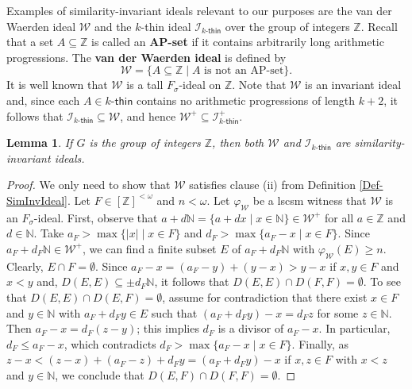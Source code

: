 \documentclass{amsart}
\newtheorem{lemma}[theorem]{Lemma}
\theoremstyle{definition}
\theoremstyle{remark}
\numberwithin{equation}{section}
\newcommand{\kthin}{k\text{-}\mathsf{thin}}
\begin{document}
Examples of similarity-invariant ideals relevant to our purposes are the van der Waerden ideal $\mathcal{W}$ and the $k$-thin ideal $\mathcal{I}_{\kthin}$ over the group of integers $\mathbb{Z}$. Recall that a set $A \subseteq \mathbb{Z}$ is called an \textbf{AP-set} if it contains arbitrarily long arithmetic progressions. The \textbf{van der Waerden ideal} is defined by
\[
  \mathcal{W} = \{A \subseteq \mathbb{Z} \mid A \text{ is not an AP-set}\}.
\]
It is well known that $\mathcal{W}$ is a tall $F_{\sigma}$-ideal on $\mathbb{Z}$. Note that $\mathcal{W}$ is an invariant ideal and, since each $A \in \kthin$ contains no arithmetic progressions of length $k+2$, it follows that $\mathcal{I}_{\kthin} \subseteq \mathcal{W}$, and hence $\mathcal{W}^{+} \subseteq \mathcal{I}^{+}_{\kthin}$. 


\begin{lemma}\label{L: similarity-invariant}
    If $G$ is the group of integers $\mathbb{Z}$, then both $\mathcal{W}$ and $\mathcal{I}_{\kthin}$ are similarity-invariant ideals.
\end{lemma}

\begin{proof}
    We only need to show that $\mathcal{W}$ satisfies clause (ii) from Definition \ref{Def-SimInvIdeal}.
    Let $F \in [\mathbb{Z}]^{<\omega}$ and $n < \omega$. Let $\varphi_{\mathcal{W}}$ be a lscsm witness that $\mathcal{W}$ is an $F_{\sigma}$-ideal. First, observe that $a + d \mathbb{N} = \{a + dx \mid x \in \mathbb{N}\} \in \mathcal{W}^{+}$ for all $a \in \mathcal{\mathbb{Z}}$ and $d \in \mathbb{N}$. Take $a_{F} > \max\{|x| \mid x \in F\}$ and $d_{F} > \max\{a_{F} - x \mid x \in F \}$. Since $a_{F} + d_{F} \mathbb{N} \in \mathcal{W}^{+}$, we can find a finite subset $E$ of $a_{F} + d_{F} \mathbb{N}$ with $\varphi_{\mathcal{W}}(E) \geq n$. Clearly, $E \cap F = \emptyset$. Since $a_{F}-x= (a_{F} -y) + (y -x) > y -x$ if $x, y \in F$ and $x < y$ and, $D(E, E) \subseteq \pm d_{F} \mathbb{N}$, it follows that $D(E,E) \cap D(F,F) = \emptyset$. To see that $D(E,E) \cap D(E,F) = \emptyset$, assume for contradiction that there exist $x \in F$  and 
    $y \in \mathbb{N}$ with  $a_{F} + d_{F}y \in E$ such that $(a_{F} + d_{F}y) - x =  d_{F}z$ for some $z \in \mathbb{N}$. Then $a_{F} - x = d_{F} (z-y)$; this implies $d_{F}$ is a divisor of $a_{F}-x$.  In particular, $d_{F} \leq a_{F}-x$, which contradicts $d_{F} > \max\{a_{F} - x \mid x \in F\}$. Finally, as $z -x < (z-x) + (a_{F} -z) + d_{F}y = (a_{F} + d_{F}y) -x$ if $x, z \in F$ with $x < z$ and $y \in \mathbb{N}$, we conclude that $D(E,F) \cap D(F,F) = \emptyset$.
\end{proof}
\end{document}
